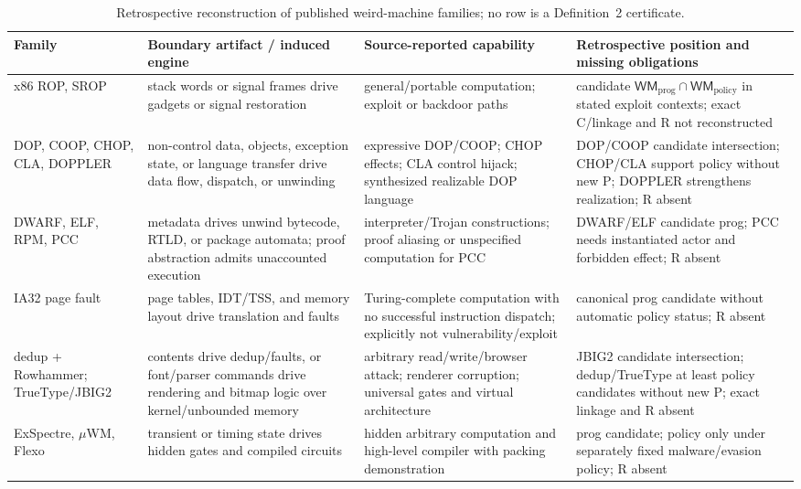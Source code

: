 \documentclass[conference]{IEEEtran}
\begin{document}
\begin{table}[!t]
\caption{Retrospective reconstruction of published weird-machine families; no row is a Definition~2 certificate.}
\label{tab:wm-corpus}
\centering
\scriptsize
\setlength{\tabcolsep}{2.5pt}
\begin{tabularx}{\textwidth}{@{}p{}p{}p{}Y@{}}
\toprule
Family & Boundary artifact / induced engine & Source-reported capability & Retrospective position and missing obligations \\
\midrule
x86 ROP, SROP \cite{ref39,ref40} & stack words or signal frames drive gadgets or signal restoration & general/portable computation; exploit or backdoor paths & candidate $\mathsf{WM}_{\mathrm{prog}}\cap\mathsf{WM}_{\mathrm{policy}}$ in stated exploit contexts; exact C/linkage and R not reconstructed \\
DOP, COOP, CHOP, CLA, DOPPLER \cite{ref41,ref42,ref43,ref56,ref57} & non-control data, objects, exception state, or language transfer drive data flow, dispatch, or unwinding & expressive DOP/COOP; CHOP effects; CLA control hijack; synthesized realizable DOP language & DOP/COOP candidate intersection; CHOP/CLA support policy without new P; DOPPLER strengthens realization; R absent \\
DWARF, ELF, RPM, PCC \cite{ref44,ref45,ref27,ref16} & metadata drives unwind bytecode, RTLD, or package automata; proof abstraction admits unaccounted execution & interpreter/Trojan constructions; proof aliasing or unspecified computation for PCC & DWARF/ELF candidate prog; PCC needs instantiated actor and forbidden effect; R absent \\
IA32 page fault \cite{ref46} & page tables, IDT/TSS, and memory layout drive translation and faults & Turing-complete computation with no successful instruction dispatch; explicitly not vulnerability/exploit & canonical prog candidate without automatic policy status; R absent \\
dedup + Rowhammer; TrueType/JBIG2 \cite{ref47,ref58,ref55} & contents drive dedup/faults, or font/parser commands drive rendering and bitmap logic over kernel/unbounded memory & arbitrary read/write/browser attack; renderer corruption; universal gates and virtual architecture & JBIG2 candidate intersection; dedup/TrueType at least policy candidates without new P; exact linkage and R absent \\
ExSpectre, $\mu$WM, Flexo \cite{ref48,ref49,ref50} & transient or timing state drives hidden gates and compiled circuits & hidden arbitrary computation and high-level compiler with packing demonstration & prog candidate; policy only under separately fixed malware/evasion policy; R absent \\

\end{tabularx}
\end{table}
\end{document}
